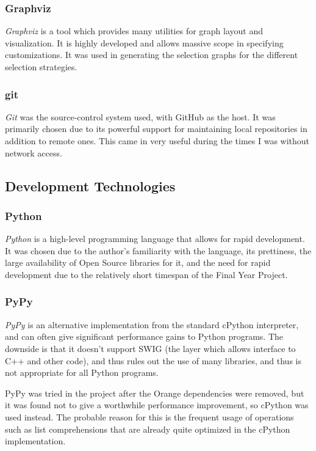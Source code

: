 \documentclass[a4paper,11pt]{report}
\begin{document}
\subsubsection*{Graphviz}
\emph{Graphviz} \citep{prog:graphviz} is a tool which provides many utilities for graph layout and visualization. It is highly developed and allows massive scope in specifying customizations. It was used in generating the selection graphs for the different selection strategies. 

\subsubsection*{git}
\emph{Git} \citep{prog:git} was the source-control system used, with GitHub as the host. It was primarily chosen due to its powerful support for maintaining local repositories in addition to remote ones. This came in very useful during the times I was without network access.


\subsection{Development Technologies}

\subsubsection*{Python}
\emph{Python} \citep{prog:python} is a high-level programming language that allows for rapid development. It was chosen due to the author's familiarity with the language, its prettiness, the large availability of Open Source libraries for it, and the need for rapid development due to the relatively short timespan of the Final Year Project.

\subsubsection*{PyPy}
\emph{PyPy} \citep{prog:pypy} is an alternative implementation from the standard cPython interpreter, and can often give significant performance gains to Python programs. The downside is that it doesn't support SWIG (the layer which allows interface to C++ and other code), and thus rules out the use of many libraries, and thus is not appropriate for all Python programs.

PyPy was tried in the project after the Orange dependencies were removed, but it was found not to give a worthwhile performance improvement, so cPython was used instead. The probable reason for this is the frequent usage of operations such as list comprehensions that are already quite optimized in the cPython implementation.
\end{document}
